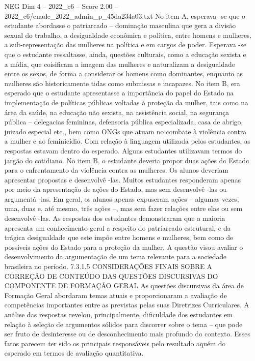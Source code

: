 \begin{textsample}{NEG Dim 4 – 2022\_c6 – Score 2.00 – 2022\_c6/enade\_2022\_admin\_p\_45da234a03.txt}
No item A, esperava -se que o estudante abordasse o patriarcado – dominação masculina que gera a divisão sexual do trabalho, a desigualdade econômica e política, entre homens e mulheres, a sub-representação das mulheres na política e em cargos de poder.
Esperava -se que o estudante ressaltasse, ainda, questões culturais, como a educação sexista e a mídia, que coisificam a imagem das mulheres e naturalizam a desigualdade entre os sexos, de forma a considerar os homens como dominantes, enquanto as mulheres são historicamente tidas como submissas e incapazes.
No item B, era esperado que o estudante apresentasse a importância do papel do Estado na implementação de políticas públicas voltadas à proteção da mulher, tais como na área da saúde, na educação não sexista, na assistência social, na segurança pública – delegacias femininas, defensoria pública especializada, casa de abrigo, juizado especial etc., bem como ONGs que atuam no combate à violência contra a mulher e ao feminicídio.
Com relação à linguagem utilizada pelos estudantes, as respostas estavam dentro do esperado.
Alguns estudantes utilizavam termos do jargão do cotidiano.
No item B, o estudante deveria propor duas ações do Estado para o enfrentamento da violência contra as mulheres.
Os alunos deveriam apresentar propostas e desenvolvê -las.
Muitos estudantes responderam apenas por meio da apresentação de ações do Estado, mas sem desenvolvê -las ou argumentá -las.
Em geral, os alunos apenas expuseram ações – algumas vezes, uma, duas e, até mesmo, três ações –, mas sem fazer relações entre elas ou sem desenvolvê -las.
As respostas dos estudantes demonstraram que a maioria apresenta um conhecimento geral a respeito do patriarcado estrutural, e da trágica desigualdade que este impõe entre homens e mulheres, bem como de possíveis ações do Estado para a proteção da mulher.
A questão visou avaliar o desenvolvimento da argumentação de um tema relevante para a sociedade brasileira no período. 7.3.1.5 CONSIDERAÇÕES FINAIS SOBRE A CORREÇÃO DE CONTEÚDO DAS QUESTÕES DISCURSIVAS DO COMPONENTE DE FORMAÇÃO GERAL As questões discursivas da área de Formação Geral abordaram temas atuais e proporcionaram a avaliação de competências importantes entre as previstas pelas suas Diretrizes Curriculares.
A análise das respostas revelou, principalmente, dificuldade dos estudantes em relação à seleção de argumentos sólidos para discorrer sobre o tema – que pode ser fruto de desinteresse ou de desconhecimento mais profundo do contexto.
Esses fatos parecem ter sido os principais responsáveis pelo resultado aquém do esperado em termos de avaliação quantitativa.

\end{textsample}
